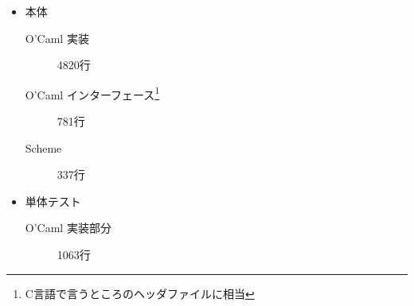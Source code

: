 \documentclass[twocolumn,a4paper,10pt]{jsarticle}
\newcommand{\texthline}{\par\vskip 2pt\rule{0.4\textwidth}{0.5pt}\vskip 2pt\par}
\begin{document}
\begin{itemize}
    \item 本体
    \begin{description}
    \item[O'Caml 実装] 4820行
    \item[O'Caml インターフェース\footnote{C言語で言うところのヘッダファイルに相当}] 781行 %
    \item[Scheme] 337行
    \end{description}

    \item 単体テスト
    \begin{description}
    \item[O'Caml 実装部分] 1063行
    \end{description}
\end{itemize}




\end{document}
